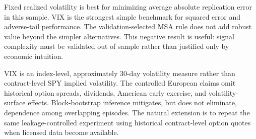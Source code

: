 \documentclass[10pt]{article}
\begin{document}
Fixed realized volatility is best for minimizing average absolute replication
error in this sample. VIX is the strongest simple benchmark for squared error
and adverse-tail performance. The validation-selected MSA rule does not add
robust value beyond the simpler alternatives. This negative result is useful:
signal complexity must be validated out of sample rather than justified only by
economic intuition.

VIX is an index-level, approximately 30-day volatility measure rather than
contract-level SPY implied volatility. The controlled European claims omit
historical option spreads, dividends, American early exercise, and
volatility-surface effects. Block-bootstrap inference mitigates, but does not
eliminate, dependence among overlapping episodes. The natural extension is to
repeat the same leakage-controlled experiment using historical contract-level
option quotes when licensed data become available.
\end{document}
